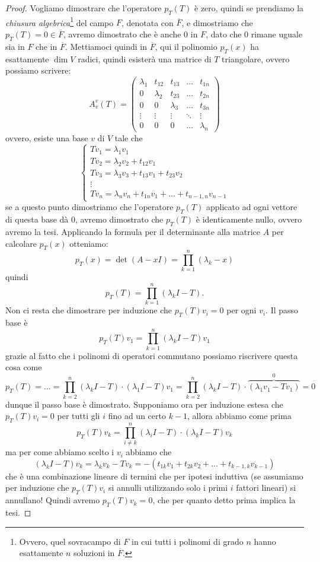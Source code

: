 \documentclass[11pt]{scrartcl}
\begin{document}
   	 \begin{proof}
   	 	Vogliamo dimostrare che l'operatore $p_T(T)$ è zero, quindi se prendiamo la \textit{chiusura algebrica}\footnote{Ovvero, quel sovracampo di $F$ in cui tutti i polinomi di grado $n$ hanno esattamente $n$ soluzioni in $\overline{F}$.} del campo $F$, denotata con $\overline{F}$, e dimostriamo che $p_T(T)=0\in \overline{F}$, avremo dimostrato che è anche $0$ in $F$, dato che $0$ rimane uguale sia in $F$ che in $\overline{F}$. Mettiamoci quindi in $\overline{F}$, qui il polinomio $p_T(x)$ ha esattamente $\dim V$ radici, quindi esisterà una matrice di $T$ triangolare, ovvero possiamo scrivere:
   	 	$$A_v^v(T)=
   	 	\begin{pmatrix}
   	 		\lambda_1 & t_{12} &t_{13} & \dots & t_{1n} \\
   	 		0 & \lambda_2 & t_{23} & \dots & t_{2n} \\
   	 		0 & 0 & \lambda_3 & \dots & t_{3n} \\
   	 		\vdots & \vdots & \vdots & \ddots & \vdots \\
   	 		0 & 0 & 0 & \dots & \lambda_n
   	 	\end{pmatrix}
   	 	$$
   	 	ovvero, esiste una base $v$ di $V$ tale che 
   	 	$$
   	 	\begin{cases}
   	 		Tv_1=\lambda_1v_1 \\
   	 		Tv_2=\lambda_2v_2+t_{12}v_1 \\
   	 		Tv_3=\lambda_3v_3+t_{13}v_1+t_{23}v_2 \\
   	 		\vdots \\
   	 		Tv_n=\lambda_nv_n+t_{1n}v_1+\dots+t_{n-1,n}v_{n-1} 
   	 	\end{cases}
   	 	$$
   	 	se a questo punto dimostriamo che l'operatore $p_T(T)$ applicato ad ogni vettore di questa base dà $0$, avremo dimostrato che $p_T(T)$ è identicamente nullo, ovvero avremo la tesi. Applicando la formula per il determinante alla matrice $A$ per calcolare $p_T(x)$ otteniamo:
   	 	$$p_T(x)=\det\left(A-xI\right)=\prod_{k=1}^n \left(\lambda_k-x\right)$$
   	 	quindi 
   	 	$$p_T(T)=\prod_{k=1}^n \left(\lambda_kI-T\right).$$
   	 	Non ci resta che dimostrare per induzione che $p_T(T)v_i=0$ per ogni $v_i$. Il passo base è
   	 	$$p_T(T)v_1=\prod_{k=1}^n \left(\lambda_kI-T\right)v_1$$
   	 	grazie al fatto che i polinomi di operatori commutano possiamo riscrivere questa cosa come
   	 	$$p_T(T)=\dots=\prod_{k=2}^n \left(\lambda_kI-T\right)\cdot\left(\lambda_1I-T\right)v_1=\prod_{k=2}^n \left(\lambda_kI-T\right)\cdot\overset{0}{\overbrace{\left(\lambda_1v_1-Tv_1\right)}}=0$$
   	 	dunque il passo base è dimostrato. Supponiamo ora per induzione estesa che $p_T(T)v_i=0$ per tutti gli $i$ fino ad un certo $k-1$, allora abbiamo come prima
   	 	$$p_T(T)v_k=\prod_{i\ne k}^n \left(\lambda_iI-T\right)\cdot\left(\lambda_kI-T\right)v_k$$
   	 	ma per come abbiamo scelto i $v_i$ abbiamo che 
   	 	$$(\lambda_kI-T)v_k=\lambda_kv_k-Tv_k=-\left(t_{1k}v_1+t_{2k}v_2+\dots+t_{k-1,k}v_{k-1}\right)$$
   	 	che è una combinazione lineare di termini che per ipotesi induttiva (se assumiamo per induzione che $p_T(T)v_i$ si annulli utilizzando solo i primi $i$ fattori lineari) si annullano! Quindi avremo $p_T(T)v_k=0$, che per quanto detto prima implica la tesi.
   	 \end{proof}
\end{document}
